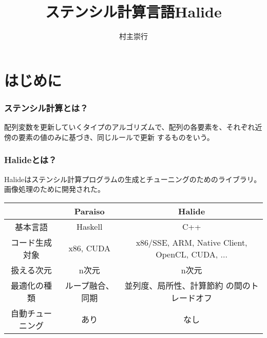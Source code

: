 \documentclass[dvipdfmx,cjk]{beamer}
\begin{document}
\title[Halide]{ステンシル計算言語Halide}
\author[T. Muranushi]{村主崇行}            %

\begin{frame}                  %
\titlepage                     %
\end{frame}

\begin{frame}                  %
\tableofcontents
\end{frame}

\section{はじめに} 

\begin{frame}\frametitle{ステンシル計算とは？}
配列変数を更新していくタイプのアルゴリズムで、配列の各要素を、それぞれ近傍の要素の値のみに基づき、同じルールで更新
するものをいう。
\end{frame}

\begin{frame}\frametitle{Halideとは？}
Halideはステンシル計算プログラムの生成とチューニングのためのライブラリ。
画像処理のために開発された。\cite{ragan2012decoupling,ragan2013halide}


\begin{center}
  \begin{tabular}{|c|c|c|}
    \hline
    &Paraiso & Halide\\
    \hline
    基本言語 & Haskell & C++ \\
    コード生成対象 & x86, CUDA &
    \multicolumn{1}{p{5cm}|}{x86/SSE, ARM, Native Client, OpenCL, CUDA,  ... }\\
    扱える次元 & n次元 & n次元 \\ 
    最適化の種類 & ループ融合、同期 & \multicolumn{1}{p{5cm}|}{並列度、局所性、計算節約 の間のトレードオフ} \\ 
    自動チューニング & あり & なし \\ 
    \hline
  \end{tabular}
\end{center}
\end{frame}
\end{document}
